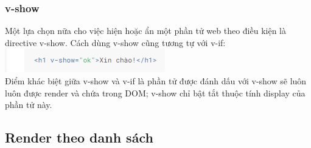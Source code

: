 \documentclass[12pt,a4paper]{report}
\begin{document}
\subsubsection{v-show}
Một lựa chọn nữa cho việc hiện hoặc ẩn một phần tử web theo điều kiện là directive v-show. Cách dùng v-show cũng tương tự với v-if:\\\includegraphics[scale=1]{40}\\Điểm khác biệt giữa v-show và v-if là phần tử được đánh dấu với v-show sẽ luôn luôn được render và chứa trong DOM; v-show chỉ bật tắt thuộc tính display của phần tử này.
\subsection{Render theo danh sách}
\end{document}
